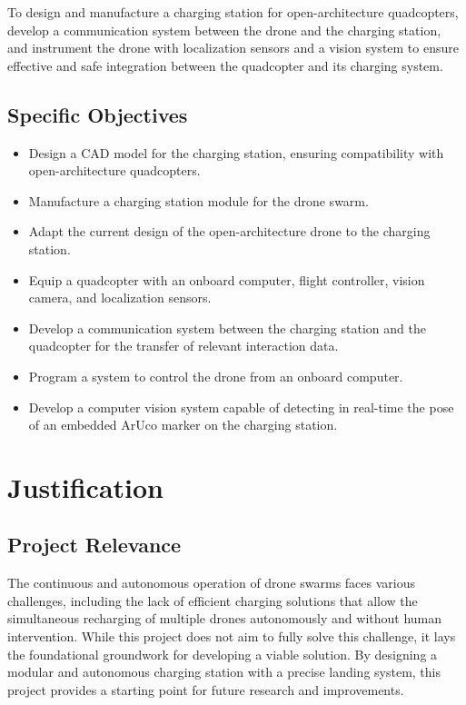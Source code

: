 To design and manufacture a charging station for open-architecture quadcopters, develop a communication system between the drone and the charging station, and instrument the drone with localization sensors and a vision system to ensure effective and safe integration between the quadcopter and its charging system.

\subsection{Specific Objectives}

\begin{itemize}
    \item Design a CAD model for the charging station, ensuring compatibility with open-architecture quadcopters.
    \item Manufacture a charging station module for the drone swarm.
    \item Adapt the current design of the open-architecture drone to the charging station.
    \item Equip a quadcopter with an onboard computer, flight controller, vision camera, and localization sensors.
    \item Develop a communication system between the charging station and the quadcopter for the transfer of relevant interaction data.
    \item Program a system to control the drone from an onboard computer.
    \item Develop a computer vision system capable of detecting in real-time the pose of an embedded ArUco marker on the charging station.
\end{itemize}

\section{Justification}

\subsection{Project Relevance}

The continuous and autonomous operation of drone swarms faces various challenges, including the lack of efficient charging solutions that allow the simultaneous recharging of multiple drones autonomously and without human intervention. While this project does not aim to fully solve this challenge, it lays the foundational groundwork for developing a viable solution. By designing a modular and autonomous charging station with a precise landing system, this project provides a starting point for future research and improvements.

